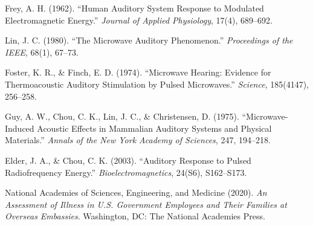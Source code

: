 \begin{thebibliography}{99}
 Frey, A. H. (1962). ``Human Auditory System Response to Modulated Electromagnetic Energy.'' \textit{Journal of Applied Physiology}, 17(4), 689--692.

 Lin, J. C. (1980). ``The Microwave Auditory Phenomenon.'' \textit{Proceedings of the IEEE}, 68(1), 67--73.

 Foster, K. R., \& Finch, E. D. (1974). ``Microwave Hearing: Evidence for Thermoacoustic Auditory Stimulation by Pulsed Microwaves.'' \textit{Science}, 185(4147), 256--258.

 Guy, A. W., Chou, C. K., Lin, J. C., \& Christensen, D. (1975). ``Microwave-Induced Acoustic Effects in Mammalian Auditory Systems and Physical Materials.'' \textit{Annals of the New York Academy of Sciences}, 247, 194--218.

 Elder, J. A., \& Chou, C. K. (2003). ``Auditory Response to Pulsed Radiofrequency Energy.'' \textit{Bioelectromagnetics}, 24(S6), S162--S173.

 National Academies of Sciences, Engineering, and Medicine (2020). \textit{An Assessment of Illness in U.S. Government Employees and Their Families at Overseas Embassies}. Washington, DC: The National Academies Press.
\end{thebibliography}
